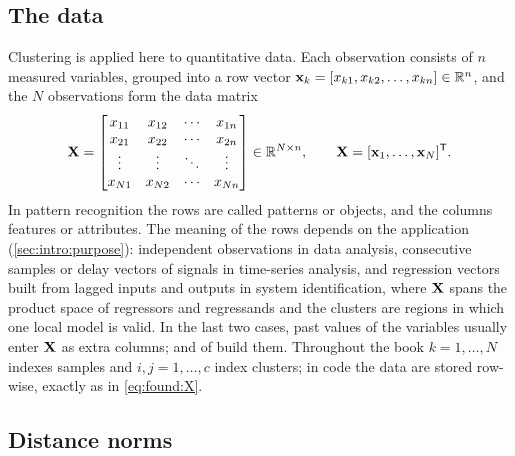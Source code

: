 \subsection{The data}\label{sec:found:data}

Clustering is applied here to quantitative data. Each observation consists of $n$ measured variables, grouped into a row vector $\mathbf{x}_k=[x_{k1},x_{k2},\dots,x_{kn}]\in\mathbb{R}^n$, and the $N$ observations form the data matrix
\begin{equation}
  \mathbf{X}=\begin{bmatrix} x_{11} & x_{12} & \cdots & x_{1n}\\ x_{21} & x_{22} & \cdots & x_{2n}\\ \vdots & \vdots & \ddots & \vdots\\ x_{N1} & x_{N2} & \cdots & x_{Nn}\end{bmatrix}\in\mathbb{R}^{N\times n},
  \qquad \mathbf{X}=[\mathbf{x}_1,\dots,\mathbf{x}_N]^{\mathsf{T}} .
  \label{eq:found:X}
\end{equation}
In pattern recognition the rows are called patterns or objects, and the columns features or attributes. The meaning of the rows depends on the application (\cref{sec:intro:purpose}): independent observations in data analysis, consecutive samples or delay vectors of signals in time-series analysis, and regression vectors built from lagged inputs and outputs in system identification, where $\mathbf{X}$ spans the product space of regressors and regressands and the clusters are regions in which one local model is valid. In the last two cases, past values of the variables usually enter $\mathbf{X}$ as extra columns;  and  of  build them. Throughout the book $k=1,\dots,N$ indexes samples and $i,j=1,\dots,c$ index clusters; in code the data are stored row-wise, exactly as in \eqref{eq:found:X}.

\subsection{Distance norms}\label{sec:found:norms}

